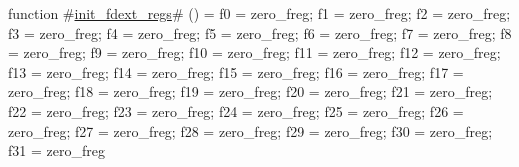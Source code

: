 function #\hyperref[sailRISCVzinitzyfdextzyregs]{init\_fdext\_regs}# () = {
  f0  = zero_freg;
  f1  = zero_freg;
  f2  = zero_freg;
  f3  = zero_freg;
  f4  = zero_freg;
  f5  = zero_freg;
  f6  = zero_freg;
  f7  = zero_freg;
  f8  = zero_freg;
  f9  = zero_freg;
  f10 = zero_freg;
  f11 = zero_freg;
  f12 = zero_freg;
  f13 = zero_freg;
  f14 = zero_freg;
  f15 = zero_freg;
  f16 = zero_freg;
  f17 = zero_freg;
  f18 = zero_freg;
  f19 = zero_freg;
  f20 = zero_freg;
  f21 = zero_freg;
  f22 = zero_freg;
  f23 = zero_freg;
  f24 = zero_freg;
  f25 = zero_freg;
  f26 = zero_freg;
  f27 = zero_freg;
  f28 = zero_freg;
  f29 = zero_freg;
  f30 = zero_freg;
  f31 = zero_freg
}
